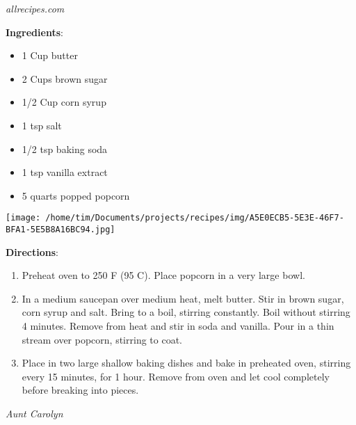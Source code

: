 \documentclass[11pt, twoside, openany]{book}
\begin{document}
 \label{caramel-popcorn}\hfill\textit{allrecipes.com}\\
\begin{minipage}[t]{0.8\linewidth}
\textbf{Ingredients}:\vspace{-3mm}
\begin{multicols}{2}
\begin{itemize}\setlength\itemsep{-1mm}
\item 1 Cup butter
\item 2 Cups brown sugar
\item 1/2 Cup corn syrup
\item 1 tsp salt
\item 1/2 tsp baking soda
\item 1 tsp vanilla extract
\item 5 quarts popped popcorn
\end{itemize}
\end{multicols}
\end{minipage}
\begin{minipage}[t]{0.2\linewidth}
\centering \strut\vspace*{-\baselineskip}\newline
\texttt{[image: /home/tim/Documents/projects/recipes/img/A5E0ECB5-5E3E-46F7-BFA1-5E5B8A16BC94.jpg]}\\
\end{minipage}\vspace{3mm}
\textbf{Directions}:
\vspace{-3mm}\begin{enumerate}\setlength\itemsep{-1mm}
\item Preheat oven to 250 F (95 C). Place popcorn in a very large bowl.
\item In a medium saucepan over medium heat, melt butter. Stir in brown sugar, corn syrup and salt. Bring to a boil, stirring constantly. Boil without stirring 4 minutes. Remove from heat and stir in soda and vanilla. Pour in a thin stream over popcorn, stirring to coat.
\item Place in two large shallow baking dishes and bake in preheated oven, stirring every 15 minutes, for 1 hour. Remove from oven and let cool completely before breaking into pieces.
\end{enumerate}
 \label{good-old-fashioned-pancakes}\hfill\textit{Aunt Carolyn}\\
\end{document}
